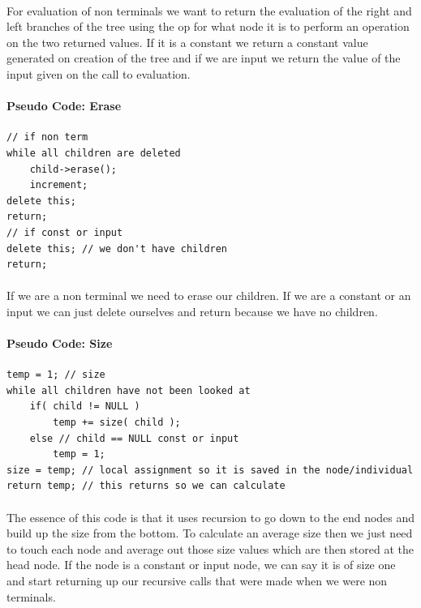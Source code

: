 \documentclass[paper=a4, fontsize=11pt]{scrartcl} %
\numberwithin{equation}{section} %
\numberwithin{figure}{section} %
\numberwithin{table}{section} %
\begin{document}
\paragraph{} For evaluation of non terminals we want to return the evaluation of the right and left branches of the tree using the op for what node it is to perform an operation on the two returned values. If it is a constant we return a constant value generated on creation of the tree and if we are input we return the value of the input given on the call to evaluation.

\paragraph{Pseudo Code: Erase}
\begin{verbatim}
// if non term
while all children are deleted
    child->erase();
    increment;
delete this;
return;
// if const or input
delete this; // we don't have children
return;
\end{verbatim}

\paragraph{} If we are a non terminal we need to erase our children. If we are a constant or an input we can just delete ourselves and return because we have no children.

\paragraph{Pseudo Code: Size}
\begin{verbatim}
temp = 1; // size
while all children have not been looked at
    if( child != NULL )
        temp += size( child );
    else // child == NULL const or input
        temp = 1;
size = temp; // local assignment so it is saved in the node/individual
return temp; // this returns so we can calculate
\end{verbatim}

\paragraph{} The essence of this code is that it uses recursion to go down to the end nodes and build up the size from the bottom. To calculate an average size then we just need to touch each node and average out those size values which are then stored at the head node. If the node is a constant or input node, we can say it is of size one and start returning up our recursive calls that were made when we were non terminals.
\end{document}
